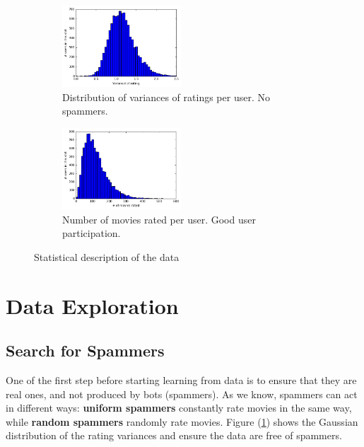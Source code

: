 \documentclass[10pt,conference,compsocconf]{IEEEtran}
\begin{document}
\begin{figure}[tbp] %
    \centering
    \hspace{-0.6cm}
    \begin{subfigure}[t]{0.45\columnwidth}
        \centering
        \includegraphics[height=1.2in]{img/Variances}
        \vspace{-3mm}
  \caption{Distribution of variances of ratings per user. No spammers.}
  \label{variances}
    \end{subfigure}%
    \hspace{0.4cm}
    \begin{subfigure}[t]{0.45\columnwidth}
        \centering
        \includegraphics[height=1.2in]{img/Ratings}
        \vspace{-3mm}
        \caption{Number of movies rated per user. Good user participation.}
        \label{number_ratings}
    \end{subfigure}
    \caption{Statistical description of the data}
\end{figure}


\section{Data Exploration}

\subsection{Search for Spammers}

One of the first step before starting learning from data is to ensure that they are real ones, and not produced by bots (spammers). As we know, spammers can act in different ways: \textbf{uniform spammers} constantly rate movies in the same way, while \textbf{random spammers} randomly rate movies. Figure (\ref{variances}) shows the Gaussian distribution of the rating variances and ensure the data are free of spammers.
\end{document}
